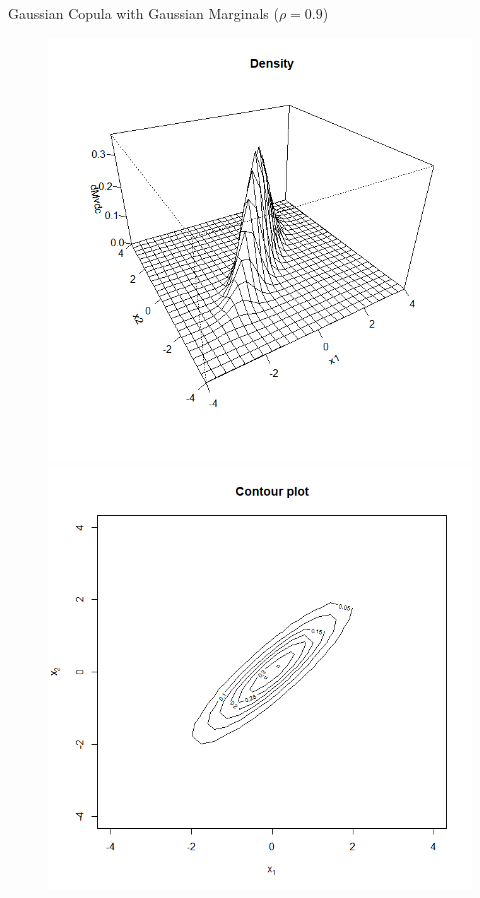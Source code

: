 \documentclass[11pt]{beamer}
\theoremstyle{plain}
\theoremstyle{definition}
\theoremstyle{remark}
\begin{document}
\begin{frame}{Gaussian Copula with Gaussian Marginals ($\rho = 0.9$)}
    \begin{figure}[ht]
        \begin{minipage}[b]{0.45\linewidth}
            \centering
            \includegraphics[width=\textwidth]{fig/gauss_gauss_density_0_9.png}
        \end{minipage}
        \hspace{0.5cm}
        \begin{minipage}[b]{0.45\linewidth}
            \centering
            \includegraphics[width=\textwidth]{fig/gauss_gauss_contour_0_9.png}

\end{minipage}
\end{figure}
\end{frame}
\end{document}
